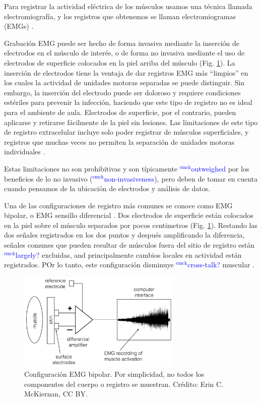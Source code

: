 \documentclass[12pt]{article}
\newcommand{\emck}[1]{\textcolor{blue}{$^{\textrm{emck}}${#1}}}
\begin{document}
Para registrar la actividad eléctrica de los músculos usamos una
técnica llamada electromiografía, y los registros que obtenemos se
llaman electromiogramas (EMGs) \cite{garcia2011surface}.

Grabación EMG puede ser hecho de forma invasiva mediante la inserción
de electrodos en el músculo de interés, o de forma no invasiva
mediante el uso de electrodos de superficie colocados en la piel
arriba del músculo (Fig. \ref{fig:emg}). La inserción de electrodos
tiene la ventaja de dar registros EMG más ``limpios'' en los cuales la
actividad de unidades motoras separadas se puede distinguir. Sin
embargo, la inserción del electrodo puede ser doloroso y requiere
condiciones estériles para prevenir la infección, haciendo que este
tipo de registro no es ideal para el ambiente de aula. Electrodos de
superficie, por el contrario, pueden aplicarse y retirarse fácilmente
de la piel sin lesiones. Las limitaciones de este tipo de registro
extracelular incluye solo poder registrar de músculos superficiales, y
registros que muchas veces no permiten la separación de unidades
motoras individuales \cite{garcia2011surface}.

Estas limitaciones no son prohibitivas y son típicamente
\emck{outweighed} por los beneficios de lo no invasivo
(\emck{non-invasiveness}), pero deben de tomar en cuenta cuando
pensamos de la ubicación de electrodos y análisis de datos.

Una de las configuraciones de registro más comunes se conoce como EMG
bipolar, o EMG sensillo diferencial \cite{garcia2011surface}. Dos
electrodos de superficie están colocados en la piel sobre el músculo
separados por pocos centimetros (Fig. \ref{fig:emg}). Restando las dos
señales registrados en los dos puntos y después amplificando la
diferencia, señales comunes que pueden resultar de músculos fuera del
sitio de registro están \emck{largely?} excluidas, and principalmente
cambios locales en actividad están registrados. POr lo tanto, este
configuración disminuye \emck{cross-talk?} muscular
\cite{garcia2011surface}.

\begin{figure}[h!]
\centering
\includegraphics[width=0.7\textwidth]{figures/emgAmp.png}
\caption{Configuración EMG bipolar. Por simplicidad, no todos los
  componentes del cuerpo o registro se muestran. Crédito: Erin
  C. McKiernan, CC BY.}
\label{fig:emg}
\end{figure}
\end{document}
